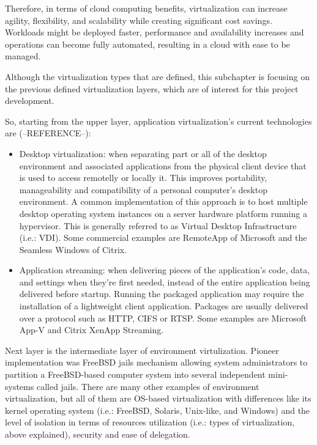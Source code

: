 Therefore, in terms of cloud computing benefits, virtualization can increase agility, flexibility, and scalability while creating significant cost savings. Workloads might be deployed faster, performance and availability increases and operations can become fully automated, resulting in a cloud with ease to be managed. 

Although the virtualization types that are defined, this subchapter is focusing on the previous defined virtualization layers, which are of interest for this project development.

So, starting from the upper layer, application virtualization's current technologies are (--REFERENCE--):

\begin{itemize}
\item Desktop virtualization: when separating part or all of the desktop environment and associated applications from the physical client device that is used to access remotelly or locally it. This improves portability, manageability and compatibility of a personal computer's desktop environment. A common implementation of this approach is to host multiple desktop operating system instances on a server hardware platform running a hypervisor. This is generally referred to as Virtual Desktop Infrastructure (i.e.: VDI). Some commercial examples are RemoteApp of Microsoft and the Seamless Windows of Citrix. 
\item Application streaming: when delivering pieces of the application's code, data, and settings when they're first needed, instead of the entire application being delivered before startup. Running the packaged application may require the installation of a lightweight client application. Packages are usually delivered over a protocol such as HTTP, CIFS or RTSP. Some examples are Microsoft App-V and Citrix XenApp Streaming.
\end{itemize}

Next layer is the intermediate layer of environment virtulization. Pioneer implementation was FreeBSD jails mechanism allowing system administrators to partition a FreeBSD-based computer system into several independent mini-systems called jails. There are many other examples of environment virtualization, but all of them are OS-based virtualization with differences like its kernel operating system (i.e.: FreeBSD, Solaris, Unix-like, and Windows) and the level of isolation in terms of resources utilization (i.e.: types of virtualization, above explained), security and ease of delegation. 

